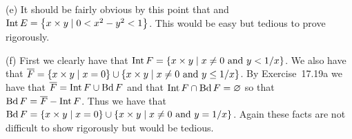 {  (e) It should be fairly obvious by this point that
  and $\mathrm{Int}\,{E} = \left\{ x \times y \mid 0 < x^2 - y^2 < 1 \right\}$.
  This would be easy but tedious to prove rigorously.

  (f) First we clearly have that $\mathrm{Int}\,{F} = \left\{ x \times y \mid x \neq 0 \text{ and } y < 1/x \right\}$.
  We also have that $\overline{F} = \left\{ x \times y \mid x = 0 \right\} \cup \left\{ x \times y \mid x \neq 0 \text{ and } y \leq 1/x \right\}$.
  By Exercise~17.19a we have that $\overline{F} = \mathrm{Int}\,{F} \cup \mathrm{Bd}\,{F}$ and that $\mathrm{Int}\,{F} \cap \mathrm{Bd}\,{F} = \varnothing$ so that $\mathrm{Bd}\,{F} = \overline{F} - \mathrm{Int}\,{F}$.
  Thus we have that $\mathrm{Bd}\,{F} = \left\{ x \times y \mid x = 0 \right\} \cup \left\{ x \times y \mid x \neq 0 \text{ and } y = 1/x \right\}$.
  Again these facts are not difficult to show rigorously but would be tedious.
}

